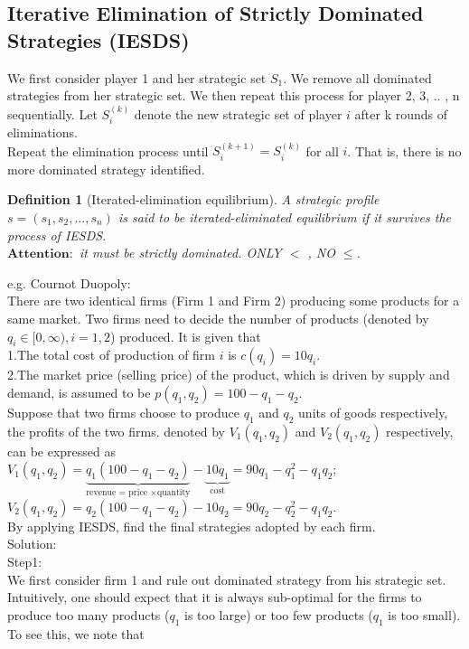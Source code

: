 \documentclass[twoside]{article}
\theoremstyle{definitionstyle}
\newtheorem*{definition}{Definition}
\begin{document}
\subsection{Iterative Elimination of Strictly Dominated Strategies (IESDS)}
We first consider player 1 and her strategic set $S_1$. We remove all dominated strategies from her strategic set. We then repeat this process for 
player 2, 3, .. , n sequentially. Let $S_i^{(k)}$ denote the new strategic set of player 
$i$ after k rounds of eliminations. \\
Repeat the elimination process until $S_i^{(k+1)}=S_i^{(k)}$ for all $i$. That is, there is no more dominated strategy identified.
\begin{definition}[Iterated-elimination equilibrium]
   A strategic profile $s=(s_1,s_2,\ldots,s_n)$ is said to be iterated-eliminated equilibrium if it survives the process of IESDS. \\
   $\mathbf{Attention:}$ it must be strictly dominated. ONLY $<$ , NO $\leq$. 
\end{definition}
e.g. Cournot Duopoly:\\
There are two identical firms (Firm 1 and Firm 2) producing some products for a 
same market. Two firms need to decide the number of products (denoted by $q_i\in[0, \infty), i= 1,2$) produced. It is given that \\
1.The total cost of production of firm $i$ is $c(q_i)=10q_i$. \\
2.The market price (selling price) of the product, which is driven by supply and demand, is assumed to be $p(q_1,q_2)=100-q_1-q_2$.  \\
Suppose that two firms choose to produce $q_1$ and $q_2$ units of goods respectively, 
the profits of the two firms. denoted by $V_1(q_1,q_2)$ and $V_2(q_1,q_2)$ respectively, can be expressed as \\
$V_1(q_1,q_2) = \underbrace{q_1(100-q_1-q_2)}_{\text{revenue = price $\times$quantity}}-\underbrace{10q_1}_{\text{cost}} = 90q_1-q_1^2-q_1q_2$; \\
$V_2(q_1,q_2) = q_2(100-q_1-q_2)-10q_2 = 90q_2-q_2^2-q_1q_2$. \\
By applying IESDS, find the final strategies adopted by each firm. \\
Solution:\\
Step1: \\
We first consider firm 1 and rule out dominated strategy from his strategic set. Intuitively, one should expect that it is always sub-optimal for the firms to produce too many products ($q_1$ is too large) or too few products ($q_1$ is too small). To see this, we note that
\end{document}
